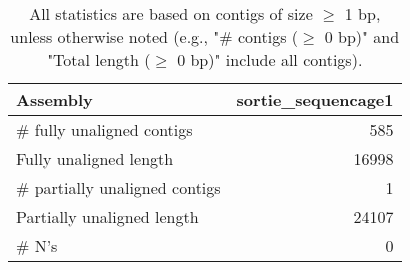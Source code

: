 \documentclass[12pt,a4paper]{article}
\begin{document}
\begin{table}[ht]
\begin{center}
\caption{All statistics are based on contigs of size $\geq$ 1 bp, unless otherwise noted (e.g., "\# contigs ($\geq$ 0 bp)" and "Total length ($\geq$ 0 bp)" include all contigs).}
\begin{tabular}{|l*{1}{|r}|}
\hline
Assembly & sortie\_sequencage1 \\ \hline
\# fully unaligned contigs & 585 \\ \hline
Fully unaligned length & 16998 \\ \hline
\# partially unaligned contigs & 1 \\ \hline
Partially unaligned length & 24107 \\ \hline
\# N's & 0 \\ \hline
\end{tabular}
\end{center}
\end{table}
\end{document}
